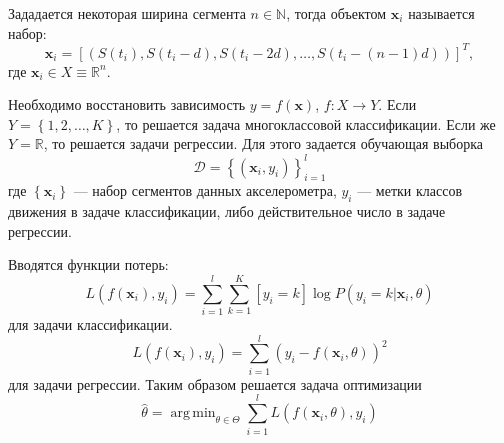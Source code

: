 \documentclass[a4paper,14pt]{extarticle}
\DeclareMathOperator*{\argmin}{arg\,min}
\numberwithin{equation}{section}
\begin{document}
	Зададается некоторая ширина сегмента $n \in \mathbb{N}$, тогда объектом $\mathbf{x}_i$ называется набор:
	\begin{equation}
	\mathbf{x}_i = [(S(t_i),S(t_i - d),S(t_i-2d),\dots,S(t_i - (n-1)d))]^T,
	\end{equation}
	где $\mathbf{x}_i \in X\equiv\mathbb{R}^n$.
	
	Необходимо восстановить зависимость $y = f(\mathbf{x})$, $f:X\rightarrow Y$. Если $Y = \left\lbrace1,2,\dots,K \right\rbrace $, то решается задача многоклассовой классификации. Если же $Y = \mathbb{R}$, то решается задачи регрессии. Для этого задается обучающая выборка
	\begin{equation}
	\mathcal{D} = \left\lbrace (\mathbf{x}_i,y_i)\right\rbrace ^l_{i=1}
	\end{equation}
	где $\left\lbrace \mathbf{x}_i\right\rbrace $ --- набор сегментов данных акселерометра, ${y_i}$ --- метки классов движения в задаче классификации, либо действительное число в задаче регрессии.
	
	Вводятся функции потерь:
	\begin{equation}
	L(f(\mathbf{x}_i),y_i) = \sum_{i=1}^{l}\sum_{k=1}^{K}[y_i = k]\log P(y_i = k|\mathbf{x}_i,\theta)
	\end{equation}  
	для задачи классификации. 
	\begin{equation}
	L(f(\mathbf{x}_i),y_i) = \sum_{i=1}^{l}(y_i - f(\mathbf{x}_i,\theta))^2
	\end{equation}
	для задачи регрессии.
	Таким образом решается задача оптимизации
	\begin{equation}
	\hat{\theta} = \argmin_{\theta \in \Theta} \sum_{i=1}^{l}L(f(\mathbf{x}_i,\theta),y_i)
	\end{equation}
	
	
\end{document}
